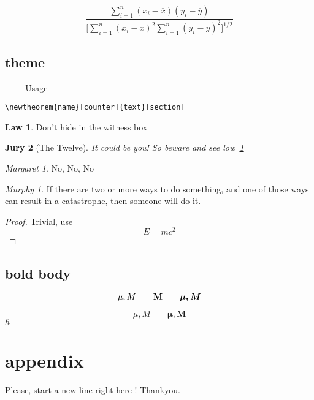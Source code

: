 \documentclass[a4paper, 11pt]{article}
\begin{document}
\begin{displaymath}
	\frac{\displaystyle \sum_{i=1}^{n}(x_i-\overline{x})(y_i - \overline{y})}{\displaystyle\biggl[\sum_{i=1}^{n}(x_i-\overline{x})^2\sum_{i=1}^{n}(y_i-\overline{y})^2\biggr]^{1/2}}
\end{displaymath}

\subsection{theme}

\begin{itemize}
\item[-] Usage\\
\end{itemize}
\begin{verbatim}
\newtheorem{name}[counter]{text}[section]
\end{verbatim}


\theoremstyle{definition}
\newtheorem{law}{Law}
\theoremstyle{plain}
\newtheorem{jury}[law]{Jury}
\theoremstyle{remark}
\newtheorem*{marge}{Margaret}

\begin{law}\label{law:box}
Don't hide in the witness box
\end{law}
\begin{jury}[The Twelve]
It could be you! So beware and see low~\ref{law:box}
\end{jury}
\begin{marge}
No, No, No
\end{marge}

\flushleft
\newtheorem{mur}{Murphy}[subsection]
\begin{mur}
If there are two or more ways to do something, and one of those ways can result in a catastrophe, then someone will do it.
\end{mur}

\begin{proof}
Trivial, use
\[E=mc^2\]
\end{proof}

\subsection{bold body}
\begin{displaymath}
\mu, M \qquad \mathbf{M} \qquad
\mbox{\boldmath $\mu, M$}
\end{displaymath}

\begin{displaymath}
\mu, M \qquad
\boldsymbol{\mu}, \boldsymbol{M}
\end{displaymath}
$\hbar$



\appendix
\section{appendix}
Please, start a new line right here ! \newline
Thankyou.
\end{document}
